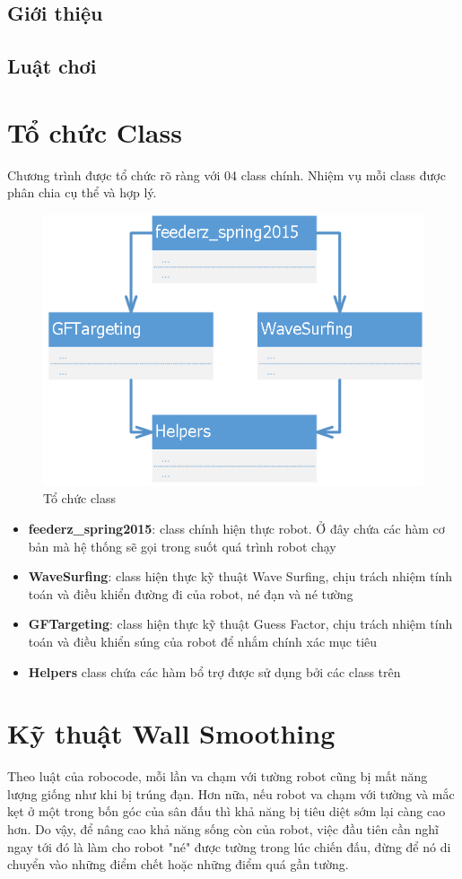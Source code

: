 \documentclass[14pt]{article}
\begin{document}
\subsection{Giới thiệu}
\subsection{Luật chơi}
\section{Tổ chức Class}
Chương trình được tổ chức rõ ràng với 04 class chính. Nhiệm vụ mỗi class được phân chia cụ thể và hợp lý.
\begin{figure}[H]
\centering
\includegraphics[scale=0.5]{images/classStructrure.png}
\caption{Tổ chức class}
\end{figure}
\begin{itemize}
	\item \textbf{feederz\_spring2015}: class chính hiện thực robot. Ở đây chứa các hàm cơ bản mà hệ thống sẽ gọi trong suốt quá trình robot chạy
	\item \textbf{WaveSurfing}: class hiện thực kỹ thuật Wave Surfing, chịu trách nhiệm tính toán và điều khiển đường đi của robot, né đạn và né tường
	\item \textbf{GFTargeting}: class hiện thực kỹ thuật Guess Factor, chịu trách nhiệm tính toán và điều khiển súng của robot để nhắm chính xác mục tiêu
	\item \textbf{Helpers} class chứa các hàm bổ trợ được sử dụng bởi các class trên
\end{itemize}
\section{Kỹ thuật Wall Smoothing}
Theo luật của robocode, mỗi lần va chạm với tường robot cũng bị mất năng lượng giống như khi bị trúng đạn. Hơn nữa, nếu robot va chạm với tường và mắc kẹt ở một trong bốn góc của sân đấu thì khả năng bị tiêu diệt sớm lại càng cao hơn. Do vậy, để nâng cao khả năng sống còn của robot, việc đầu tiên cần nghĩ ngay tới đó là làm cho robot "né" được tường trong lúc chiến đấu, đừng để nó di chuyển vào những điểm chết hoặc những điểm quá gần tường.
\end{document}
